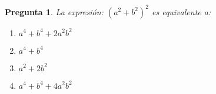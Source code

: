 \documentclass{article}
\newtheorem {Pregunta}{Pregunta}
\newenvironment{pregunta}{\begin{Pregunta} \rm}{\rm\end{Pregunta}}
\newenvironment{opciones}{\begin{enumerate}
    \renewcommand{\theenumi}{\Alph{enumi}}}
{\end{enumerate}\renewcommand{\theenumi}{\roman{enumi}}}
\begin{document}
\begin{pregunta}
La expresi\'on:
$(a^2+b^2)^2$ es equivalente a:

\begin{opciones}
\item $a^4+b^4+2a^2b^2$  %
\item $a^4+b^4$          %
\item $a^2+2b^2$         %
\item $a^4+b^4+4a^2b^2$ 
\end{opciones}

\end{pregunta}
\end{document}
